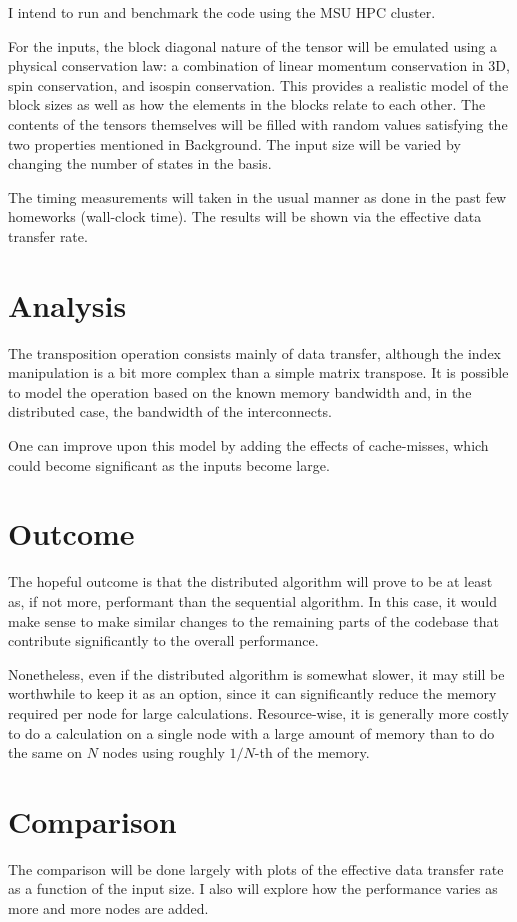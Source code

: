 \documentclass[fleqn, 12pt]{article}
\begin{document}
I intend to run and benchmark the code using the MSU HPC cluster.

For the inputs, the block diagonal nature of the tensor will be emulated using a physical conservation law: a combination of linear momentum conservation in 3D, spin conservation, and isospin conservation.  This provides a realistic model of the block sizes as well as how the elements in the blocks relate to each other.  The contents of the tensors themselves will be filled with random values satisfying the two properties mentioned in Background.  The input size will be varied by changing the number of states in the basis.

The timing measurements will taken in the usual manner as done in the past few homeworks (wall-clock time).  The results will be shown via the effective data transfer rate.

\section{Analysis}

The transposition operation consists mainly of data transfer, although the index manipulation is a bit more complex than a simple matrix transpose.  It is possible to model the operation based on the known memory bandwidth and, in the distributed case, the bandwidth of the interconnects.

One can improve upon this model by adding the effects of cache-misses, which could become significant as the inputs become large.

\section{Outcome}

The hopeful outcome is that the distributed algorithm will prove to be at least as, if not more, performant than the sequential algorithm.  In this case, it would make sense to make similar changes to the remaining parts of the codebase that contribute significantly to the overall performance.

Nonetheless, even if the distributed algorithm is somewhat slower, it may still be worthwhile to keep it as an option, since it can significantly reduce the memory required per node for large calculations.  Resource-wise, it is generally more costly to do a calculation on a single node with a large amount of memory than to do the same on $N$ nodes using roughly $1/N$-th of the memory.

\section{Comparison}

The comparison will be done largely with plots of the effective data transfer rate as a function of the input size.  I also will explore how the performance varies as more and more nodes are added.
\end{document}
